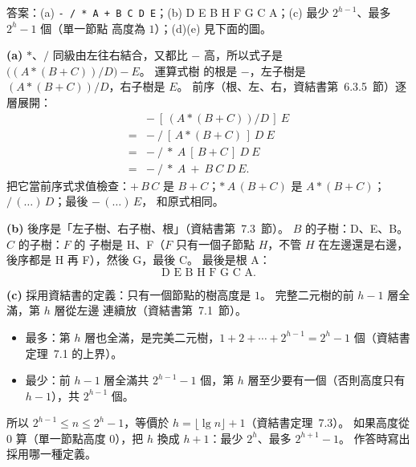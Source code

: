 \begin{pastsoln}
答案：(a) \texttt{- / * A + B C D E}；(b) D E B H F G C A；(c) 最少 $2^{h-1}$、最多 $2^h - 1$ 個（單一節點
高度為 $1$）；(d)(e) 見下面的圖。

\textbf{(a)} $*$、$/$ 同級由左往右結合，又都比 $-$ 高，所以式子是 $\bigl((A*(B+C))/D\bigr)-E$。 運算式樹
的根是 $-$，左子樹是 $(A*(B+C))/D$，右子樹是 $E$。 前序（根、左、右，資結書第~6.3.5~節）逐層展開：
\[
\begin{aligned}
&{-}\ [\,(A*(B+C))/D\,]\ E \\
={}&{-}\ {/}\ [\,A*(B+C)\,]\ D\ E \\
={}&{-}\ {/}\ {*}\ A\ [\,B+C\,]\ D\ E \\
={}&{-}\ {/}\ {*}\ A\ {+}\ B\ C\ D\ E.
\end{aligned}
\]
把它當前序式求值檢查：$+\,B\,C$ 是 $B+C$；$*\,A\,(B+C)$ 是 $A*(B+C)$；$/\,(\ldots)\,D$；最後 $-\,(\ldots)\,E$，
和原式相同。

\textbf{(b)} 後序是「左子樹、右子樹、根」（資結書第~7.3~節）。 $B$ 的子樹：D、E、B。 $C$ 的子樹：$F$ 的
子樹是 H、F（$F$ 只有一個子節點 $H$，不管 $H$ 在左邊還是右邊，後序都是 H 再 F），然後 G，最後 C。 最後是根 A：
\[
\text{D E B H F G C A}.
\]

\textbf{(c)} 採用資結書的定義：只有一個節點的樹高度是 $1$。 完整二元樹的前 $h - 1$ 層全滿，第 $h$ 層從左邊
連續放（資結書第~7.1~節）。
\begin{itemize}
\item 最多：第 $h$ 層也全滿，是完美二元樹，$1 + 2 + \cdots + 2^{h-1} = 2^h - 1$ 個（資結書定理~7.1 的上界）。
\item 最少：前 $h - 1$ 層全滿共 $2^{h-1} - 1$ 個，第 $h$ 層至少要有一個（否則高度只有 $h - 1$），共
$2^{h-1}$ 個。
\end{itemize}
所以 $2^{h-1} \le n \le 2^h - 1$，等價於 $h = \lfloor \lg n \rfloor + 1$（資結書定理~7.3）。 如果高度從 $0$
算（單一節點高度 $0$），把 $h$ 換成 $h + 1$：最少 $2^h$、最多 $2^{h+1} - 1$。 作答時寫出採用哪一種定義。


\end{pastsoln}
